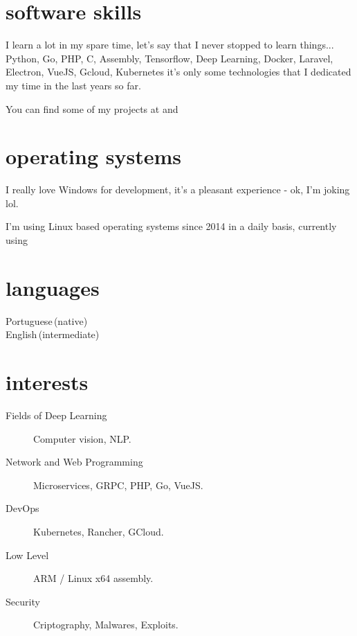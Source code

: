 \documentclass[]{cv-mauri}
\begin{document}
\section*{software skills}
    I learn a lot in my spare time, let's say that I never stopped to learn things... Python, Go, PHP, C, Assembly, Tensorflow, Deep Learning, Docker, Laravel, Electron, VueJS, Gcloud, Kubernetes it's only some technologies that I dedicated my time in the last years so far.

    You can find some of my projects at \href{https://github.com/mauri870}{\color{maincolor}{https://github.com/mauri870}} and \href{https://mauri870.github.io}{\color{maincolor}{https://mauri870.github.io}}

\section*{operating systems}
	I really love Windows for development, it's a pleasant experience - ok, I'm joking lol.
	
	I'm using Linux based operating systems since 2014 in a daily basis, currently using \href{https://github.com/mauri870/dot-files}{} 

\section*{languages}
\begin{tabularcv}
    Portuguese\,(native)\\[\vspacepar]
    English\,(intermediate)
\end{tabularcv}

\section*{interests}
	\begin{description}
		\item [Fields of Deep Learning] Computer vision, NLP.
		\item [Network and Web Programming] Microservices, GRPC, PHP, Go, VueJS.
		\item [DevOps] Kubernetes, Rancher, GCloud.
		\item [Low Level] ARM / Linux x64 assembly.
		\item [Security] Criptography, Malwares, Exploits.
	\end{description}
\end{document}
